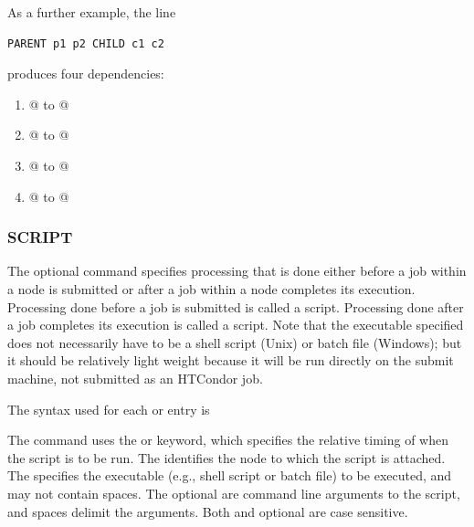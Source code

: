 As a further example, the line
\begin{verbatim}
PARENT p1 p2 CHILD c1 c2
\end{verbatim}
produces four dependencies:
\begin{enumerate}
\item{@ to @}
\item{@ to @}
\item{@ to @}
\item{@ to @}
\end{enumerate}

\subsubsection{\label{sec:dagman_script_command}SCRIPT}
\label{dagman:SCRIPT}

The optional  command specifies
processing that is done either before a job within
a node is submitted
or after a job within a node completes its execution.
Processing done before a job is submitted is
called a  script.
Processing done after a job completes its execution is
called a  script.
Note that the executable specified does not necessarily
have to be a shell script (Unix) or batch file (Windows);
but it should be relatively light weight because it will
be run directly on the submit machine, not submitted as
an HTCondor job.

The syntax used for each  or  entry is

 
   

 
    

The  command uses
the  or  keyword,
which specifies the relative timing of when the script is to be run.
The  identifies the node to which the script is attached.
The 
specifies the executable (e.g., shell script or batch file) to be executed, 
and may not contain spaces.
The optional  are command line arguments to the script,
and spaces delimit the arguments.
Both  and optional  are
case sensitive.

